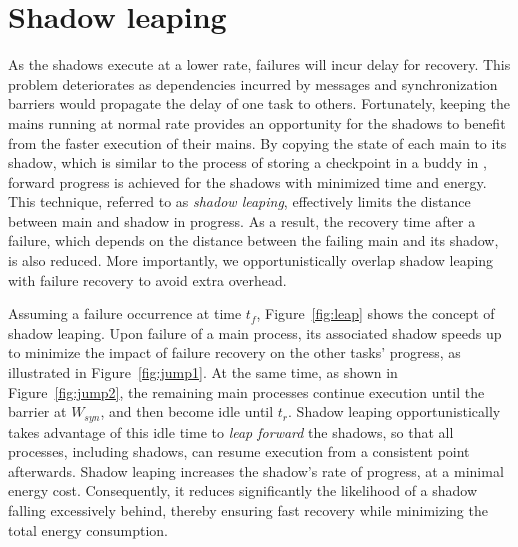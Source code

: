 \section{Shadow leaping}
\label{sec:leaping_shadows}

As the shadows execute at a lower rate, failures will incur delay for recovery. This problem deteriorates as dependencies incurred by messages and synchronization barriers would propagate the delay of one task to others.  
Fortunately, keeping the mains running at normal rate provides an opportunity for the shadows to benefit from the faster execution of their mains. By copying the state of each main to its shadow, which is similar to the process of storing a checkpoint in a buddy in \cite{zheng_2004_ftccharm}, forward progress is achieved for the shadows with minimized time and energy. This technique, referred to as \textit{shadow leaping}, effectively limits the distance between main and shadow in progress. 
As a result, the recovery time after a failure, which depends on the distance between the failing main 
and its shadow, is also reduced. 
More importantly, 
we opportunistically overlap shadow leaping with failure recovery to avoid extra overhead. 

Assuming a failure occurrence at time $t_f$, Figure~\ref{fig:leap} shows the concept of shadow leaping. 
Upon failure of a main process, its associated shadow speeds up to minimize the impact of failure recovery on the other tasks' progress, as illustrated in Figure~\ref{fig:jump1}. 
At the same time, as shown in Figure~\ref{fig:jump2}, the remaining main processes continue execution until the barrier at $W_{syn}$, and then become idle until $t_r$. 
Shadow leaping opportunistically takes advantage of this idle time to {\it leap forward} the shadows, so that  
all processes, including shadows, can resume execution from a consistent point afterwards. 
Shadow leaping increases the shadow's rate of progress, at a minimal energy cost. Consequently, it reduces significantly the likelihood of a shadow falling excessively behind, thereby ensuring fast recovery while minimizing the total energy consumption.

